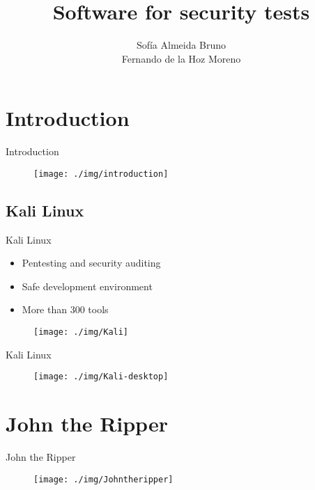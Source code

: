 \documentclass{beamer}
\title{Software for security tests}
\subtitle{}
\author{Sofía Almeida Bruno\\\qquad\quad Fernando de la Hoz Moreno}
\date{}
\begin{document}
\begin{frame}
  \maketitle
\end{frame}

\begin{frame}{}
  \tableofcontents
\end{frame}

\section{Introduction}
\begin{frame}{Introduction}
  \begin{figure}[h]
    \centering
    \texttt{[image: ./img/introduction]}
  \end{figure}
\end{frame}

\subsection{Kali Linux}
\begin{frame}{Kali Linux}
  \begin{itemize}
  \item Pentesting and security auditing
  \item Safe development environment
  \item More than 300 tools
  \end{itemize}

    \begin{figure}[h]
    \centering
    \texttt{[image: ./img/Kali]}
  \end{figure}
\end{frame}

\begin{frame}{Kali Linux}
    \begin{figure}[h]
    \centering
    \texttt{[image: ./img/Kali-desktop]}
  \end{figure}
\end{frame}

\section{John the Ripper}
\begin{frame}{John the Ripper}
  \begin{figure}[h]
    \centering
    \texttt{[image: ./img/Johntheripper]}
  \end{figure}
\end{frame}
\end{document}
